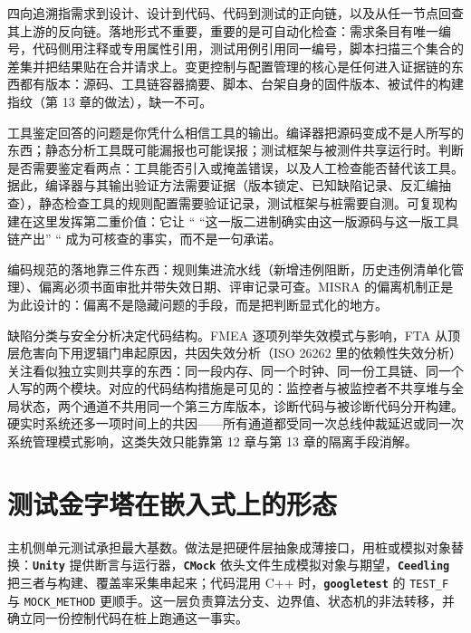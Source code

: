 \documentclass[12pt,a4paper,fontset=fandol]{ctexbook}
\newcommand{\Tp}[1]{\texttt{#1}}
\newcommand{\Lib}[1]{\textbf{\texttt{#1}}}
\newcommand{\Lang}[1]{\textsf{#1}}
\begin{document}
四向追溯指需求到设计、设计到代码、代码到测试的正向链，以及从任一节点回查其上游的反向链。落地形式不重要，重要的是可自动化检查：需求条目有唯一编号，代码侧用注释或专用属性引用，测试用例引用同一编号，脚本扫描三个集合的差集并把结果贴在合并请求上。变更控制与配置管理的核心是任何进入证据链的东西都有版本：源码、工具链容器摘要、脚本、台架自身的固件版本、被试件的构建指纹（第 13 章的做法），缺一不可。

工具鉴定回答的问题是你凭什么相信工具的输出。编译器把源码变成不是人所写的东西；静态分析工具既可能漏报也可能误报；测试框架与被测件共享运行时。判断是否需要鉴定看两点：工具能否引入或掩盖错误，以及人工检查能否替代该工具。据此，编译器与其输出验证方法需要证据（版本锁定、已知缺陷记录、反汇编抽查），静态检查工具的规则配置需要验证记录，测试框架与桩需要自测。可复现构建在这里发挥第二重价值：它让 `` ``这一版二进制确实由这一版源码与这一版工具链产出'' `` 成为可核查的事实，而不是一句承诺。

编码规范的落地靠三件东西：规则集进流水线（新增违例阻断，历史违例清单化管理）、偏离必须书面审批并带失效日期、评审记录可查。MISRA 的偏离机制正是为此设计的：偏离不是隐藏问题的手段，而是把判断显式化的地方。

缺陷分类与安全分析决定代码结构。FMEA 逐项列举失效模式与影响，FTA 从顶层危害向下用逻辑门串起原因，共因失效分析（\Lang{ISO} 26262 里的依赖性失效分析）关注看似独立实则共享的东西：同一段内存、同一个时钟、同一份工具链、同一个人写的两个模块。对应的代码结构措施是可见的：监控者与被监控者不共享堆与全局状态，两个通道不共用同一个第三方库版本，诊断代码与被诊断代码分开构建。硬实时系统还多一项时间上的共因——所有通道都受同一次总线仲裁延迟或同一次系统管理模式影响，这类失效只能靠第 12 章与第 13 章的隔离手段消解。

\section{测试金字塔在嵌入式上的形态}
\label{sec:ch14-tiers}

主机侧单元测试承担最大基数。做法是把硬件层抽象成薄接口，用桩或模拟对象替换：\Lib{Unity} 提供断言与运行器，\Lib{CMock} 依头文件生成模拟对象与期望，\Lib{Ceedling} 把三者与构建、覆盖率采集串起来；代码混用 \Lang{C++} 时，\Lib{googletest} 的 \Tp{TEST\_F} 与 \Tp{MOCK\_METHOD} 更顺手。这一层负责算法分支、边界值、状态机的非法转移，并确立同一份控制代码在桩上跑通这一事实。
\end{document}
